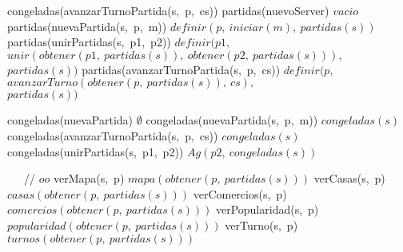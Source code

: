 \begin{tad}{}
\vspace{3mm}
    \tadAlinearAxiomas
    {congeladas(avanzarTurnoPartida(s,\ p,\ cs))}
        \tadAxioma
            {partidas(nuevoServer)}
            {$vacio$}
        \tadAxioma
            {partidas(nuevaPartida(s,\ p,\ m))}
            {$definir(p,\ iniciar(m),\ partidas(s))$}
        \tadAxioma
            {partidas(unirPartidas(s,\ p1,\ p2))}
            {$definir(p1,\ $\\$ 
            $\tab$ unir(obtener(p1,\ partidas(s)),\ obtener(p2,\ partidas(s))),\ $\\$ 
            $\tab$ partidas(s))$}
        \tadAxioma
            {partidas(avanzarTurnoPartida(s,\ p,\ cs))}
            {$definir(p,\ $\\$
            $\tab$ avanzarTurno(obtener(p,\ partidas(s)),\ cs),\ $\\$
            $\tab$ partidas(s))$}

        \tadAxioma
            {congeladas(nuevaPartida)}
            {$\emptyset$}         
        \tadAxioma    
            {congeladas(nuevaPartida(s,\ p,\ m))}
            {$congeladas(s)$}
        \tadAxioma
            {congeladas(avanzarTurnoPartida(s,\ p,\ cs))}
            {$ congeladas(s)$}
        \tadAxioma
            {congeladas(unirPartidas(s,\ p1,\ p2))}
            {$ Ag(p2,\ congeladas(s))  $}
        
        \ \ \ // $oo$
        \tadAxioma
            {verMapa(s,\ p)}
            {$ mapa(obtener(p,\ partidas(s)))$}
        \tadAxioma
            {verCasas(s,\ p)}
            {$casas(obtener(p,\ partidas(s)))$}
        \tadAxioma
            {verComercios(s,\ p)}
            {$comercios(obtener(p,\ partidas(s)))$}
        \tadAxioma
            {verPopularidad(s,\ p)}
            {$popularidad(obtener(p,\ partidas(s)))$}
        \tadAxioma
            {verTurno(s,\ p)}
            {$turnos(obtener(p,\ partidas(s)))$}
        
\end{tad}


\pagebreak


